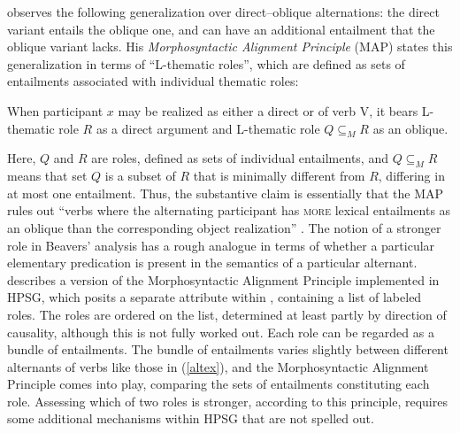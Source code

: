 \documentclass[output=paper
 	        ,biblatex
                ,babelshorthands
                ,newtxmath
                ,draftmode
                ,colorlinks, citecolor=brown
]{langscibook}
\begin{document}

\citet{Beavers2010} observes the following generalization over direct--oblique alternations:  the direct variant entails the oblique one, and can have an additional entailment that the oblique variant lacks.  
His \emph{Morphosyntactic Alignment Principle} (MAP) states this generalization in terms of ``L-thematic roles'', which are defined as sets of entailments associated with individual thematic roles:   

\begin{exe}
\ex\label{beavers-map}
When participant $x$ may be realized as either a direct or  of verb V, it bears L-thematic role $R$ as a direct argument and L-thematic role $Q\subseteq_{M}R$ as an oblique.
\citep[848]{Beavers2010}
\end {exe}

\noindent
Here, $Q$ and $R$ are roles, defined as sets of individual entailments, and  $Q\subseteq_{M}R$ means that set $Q$ is a subset of $R$ that is minimally different from $R$, differing in at most one entailment.
Thus, the substantive claim is essentially that the MAP rules out ``verbs where the alternating participant has \textsc{more} lexical entailments as an oblique than the corresponding object realization'' \citep[849]{Beavers2010}.
The notion of a stronger role in Beavers' analysis has a rough analogue in terms of whether a particular elementary predication is present in the semantics of a particular alternant.
\citet{Beavers2005} describes a version of the Morphosyntactic Alignment Principle implemented in HPSG, which posits a separate  attribute within , containing a list of labeled roles.
The roles are ordered on the  list, determined at least partly by direction of causality, although this is not fully worked out.
Each role can be regarded as a bundle of entailments.
The bundle of entailments varies slightly between different alternants of verbs like those in (\ref{altex}), and the Morphosyntactic Alignment Principle comes into play, comparing the sets of entailments constituting each role.
Assessing which of two roles is stronger, according to this principle, requires some additional mechanisms within HPSG that are not spelled out.
\end{document}
